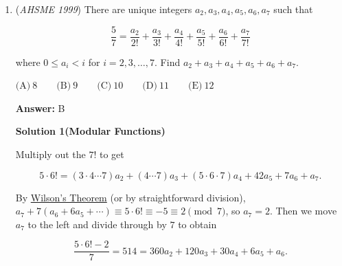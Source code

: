 \begin{enumerate}
 $\mathrm{(A) \ } \frac 1{15} \qquad \mathrm{(B) \ } \frac 1{91} \qquad \mathrm{(C) \ } \frac 1{273} \qquad \mathrm{(D) \ } \frac 1{455} \qquad \mathrm{(E) \ } \frac 1{1365}$

 \textbf{Answer: }B



\textbf{Solution}

There are 15 chords on the circle, which is found by using the diagonal formula n(n-3)/2 where n is 6, and adding 6 adjacent pairs of points. There are 15 choose 4 ways to choose chords, which is 15*14*13*12 divided by 4*3*2*1 = 91 * 15. Choosing four chords that form a convex quadrilateral is the same as choosing four points, since there is only one convex quadrilateral that can be formed with those points. So, the favorable outcomes is 6 Choose 4 which equals 6 Choose 2 which equals 6*5 divided by 2 which equals 15. Therefore, the answer is 15/91*15 = 1/91 = Option B

 


	\item (\textit{AHSME 1999}) There are unique integers $a_{2},a_{3},a_{4},a_{5},a_{6},a_{7}$ such that


 
 \[\frac {5}{7} = \frac {a_{2}}{2!} + \frac {a_{3}}{3!} + \frac {a_{4}}{4!} + \frac {a_{5}}{5!} + \frac {a_{6}}{6!} + \frac {a_{7}}{7!}\]


 where $0\leq a_{i} < i$ for $i = 2,3,\ldots,7$.  Find $a_{2} + a_{3} + a_{4} + a_{5} + a_{6} + a_{7}$.


 $\textrm{(A)} \ 8 \qquad \textrm{(B)} \ 9 \qquad \textrm{(C)} \ 10 \qquad \textrm{(D)} \ 11 \qquad \textrm{(E)} \ 12$

 \textbf{Answer: }B



\textbf{Solution 1(Modular Functions)}

Multiply out the $7!$ to get 

 
 \[5 \cdot 6! = (3 \cdot 4 \cdots 7)a_2 + (4 \cdots 7)a_3 + (5 \cdot 6 \cdot 7)a_4 + 42a_5 + 7a_6 + a_7 .\]

 By \href{https://artofproblemsolving.com/wiki/index.php?title=Wilson\%27s\_Theorem}{Wilson's Theorem} (or by straightforward division), $a_7 + 7(a_6 + 6a_5 + \cdots) \equiv 5 \cdot 6! \equiv -5 \equiv 2 \pmod{7}$, so $a_7 = 2$. Then we move $a_7$ to the left and divide through by $7$ to obtain 

 
 \[\frac{5 \cdot 6!-2}{7} = 514 = 360a_2 + 120a_3 + 30a_4 + 6a_5 + a_6.\] 


\end{enumerate}
